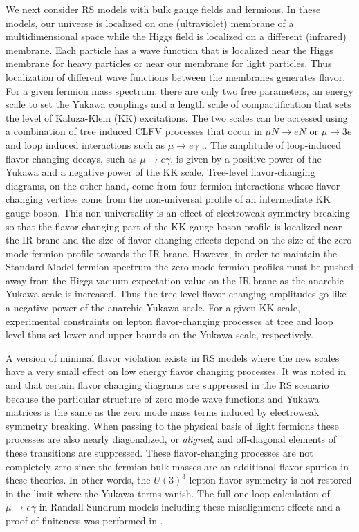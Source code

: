 We next consider RS models with
bulk gauge fields and fermions.   In these models, our universe
 is localized on one (ultraviolet) membrane of a multidimensional 
 space while the Higgs field is localized on a different (infrared) membrane. 
  Each particle has a wave function that is localized near the Higgs 
  membrane for heavy particles or near our membrane 
  for light particles. Thus localization of different wave functions between
   the membranes  generates flavor.
For a given fermion mass spectrum, there are only two free parameters,
 an energy scale to set the Yukawa couplings and a length scale of 
 compactification that sets the level of Kaluza-Klein  (KK) excitations.  The two scales can be accessed using a combination of tree induced CLFV processes that occur in $\mu N\rightarrow e N$ or $\mu\rightarrow 3e$ and loop induced interactions such as $\mu\rightarrow e\gamma$ \cite{Agashe:2006iy},\cite{Csaki:2010a}. The amplitude of loop-induced
flavor-changing decays, such as $\mu\to e \gamma$, is given by a
positive power of the Yukawa and a negative power of the KK
scale.  Tree-level flavor-changing diagrams, on the other hand, come
from four-fermion interactions whose flavor-changing vertices come
from the non-universal profile of an intermediate KK gauge boson. This
non-universality is an effect of electroweak symmetry breaking so that
the flavor-changing part of the KK gauge boson profile is localized
near the IR brane and the size of flavor-changing effects depend on
the size of the zero mode fermion profile towards the IR
brane. However, in order to maintain the Standard Model fermion
spectrum the zero-mode fermion profiles must be pushed away from the
Higgs vacuum expectation value on the IR brane as the anarchic Yukawa scale is
increased. Thus the tree-level flavor changing amplitudes go like a
negative power of the anarchic Yukawa scale. For a given KK scale,
experimental constraints on lepton flavor-changing processes at tree
and loop level thus set lower and upper bounds on the Yukawa scale,
respectively.

A version of minimal flavor violation exists in RS models where the new
 scales have a very small effect on low energy flavor changing processes.  
 It was noted in \cite{Agashe:2006iy} and \cite{Agashe:2004cp} that
certain flavor changing diagrams are suppressed in the RS scenario
because the particular structure of zero mode wave functions and
Yukawa matrices is the same as the zero mode mass terms induced by
electroweak symmetry breaking. When passing to the physical basis
of light fermions these processes are also nearly diagonalized, or
\textit{aligned}, and off-diagonal elements of these transitions are
suppressed. These flavor-changing processes are not completely zero 
since the fermion bulk masses are an additional flavor spurion
in these theories. In other words, the $U(3)^3$ lepton flavor 
symmetry is not restored in the limit where the Yukawa terms vanish. 
%
The full one-loop calculation of $\mu\to e \gamma$ in Randall-Sundrum
models including these misalignment effects and a proof of finiteness 
was performed in \cite{Csaki:2010a}.

